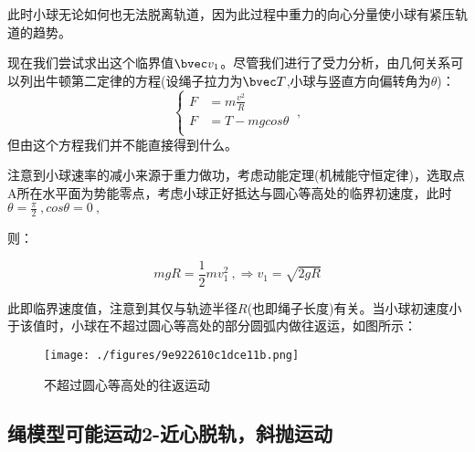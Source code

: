 此时小球无论如何也无法脱离轨道，因为此过程中重力的向心分量使小球有紧压轨道的趋势。

现在我们尝试求出这个临界值$\bvec v_1$。尽管我们进行了受力分析，由几何关系可以列出牛顿第二定律的方程(设绳子拉力为$\bvec T$,小球与竖直方向偏转角为$\theta$)：
$$
\left \{
\begin{aligned}
F&=m\frac{v^2}{R}\\
F&=T-mg cos \theta \\
\end{aligned}
\right.
~,
$$
但由这个方程我们并不能直接得到什么。

注意到小球速率的减小来源于重力做功，考虑动能定理(机械能守恒定律)，选取点A所在水平面为势能零点，考虑小球正好抵达与圆心等高处的临界初速度，此时
$\theta=\frac{\pi }{2}~, cos \theta=0~,$

则：

\begin{equation}
mgR = \frac12 mv_1^2 ~,
\Rightarrow 
v_1=\sqrt{2gR}
\end{equation}

此即临界速度值，注意到其仅与轨迹半径$R$(也即绳子长度)有关。当小球初速度小于该值时，小球在不超过圆心等高处的部分圆弧内做往返运，如图所示：
\begin{figure}[ht]
\centering
\texttt{[image: ./figures/9e922610c1dce11b.png]}
\caption{不超过圆心等高处的往返运动} \label{fig_CirVer_2}
\end{figure}




\subsection{绳模型可能运动2-近心脱轨，斜抛运动}